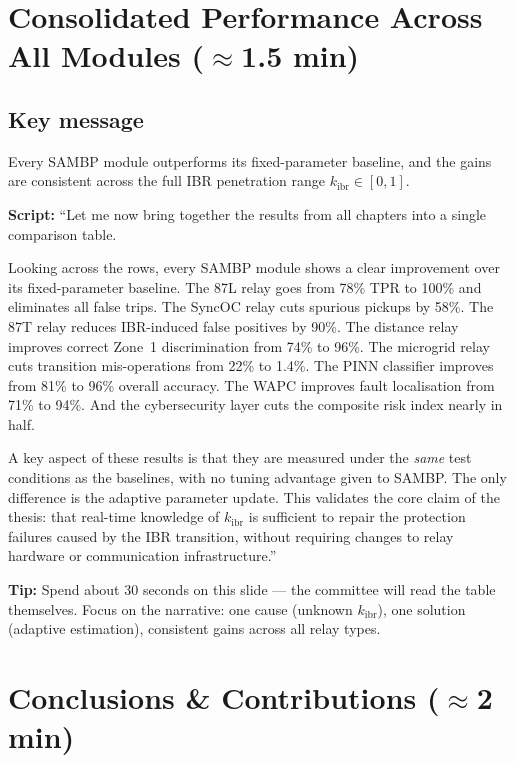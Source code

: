 \documentclass[11pt,a4paper]{article}
\newcommand{\script}[1]{\begin{scriptbox}\textbf{Script:} #1\end{scriptbox}}
\newcommand{\tip}[1]{\begin{tipbox}\textbf{Tip:} #1\end{tipbox}}
\newcommand{\kibr}{k_{\mathrm{ibr}}}
\begin{document}
\section{Consolidated Performance Across All Modules \hfill\normalfont\small($\approx$1.5 min)}
\label{slide:consolidated}

\subsection*{Key message}
Every SAMBP module outperforms its fixed-parameter baseline, and the gains are
consistent across the full IBR penetration range $\kibr \in [0, 1]$.

\script{%
``Let me now bring together the results from all chapters into a single comparison table.

Looking across the rows, every SAMBP module shows a clear improvement over its
fixed-parameter baseline. The 87L relay goes from 78\% TPR to 100\% and eliminates
all false trips. The SyncOC relay cuts spurious pickups by 58\%. The 87T relay reduces
IBR-induced false positives by 90\%. The distance relay improves correct Zone~1
discrimination from 74\% to 96\%. The microgrid relay cuts transition mis-operations
from 22\% to 1.4\%. The PINN classifier improves from 81\% to 96\% overall accuracy.
The WAPC improves fault localisation from 71\% to 94\%. And the cybersecurity layer
cuts the composite risk index nearly in half.

A key aspect of these results is that they are measured under the \emph{same} test
conditions as the baselines, with no tuning advantage given to SAMBP. The only
difference is the adaptive parameter update. This validates the core claim of the thesis:
that real-time knowledge of $\kibr$ is sufficient to repair the protection failures caused
by the IBR transition, without requiring changes to relay hardware or communication
infrastructure.''%
}

\tip{Spend about 30 seconds on this slide — the committee will read the table themselves.
Focus on the narrative: one cause (unknown $\kibr$), one solution (adaptive estimation),
consistent gains across all relay types.}

\section{Conclusions \& Contributions \hfill\normalfont\small($\approx$2 min)}
\label{slide:conclusions}
\end{document}
